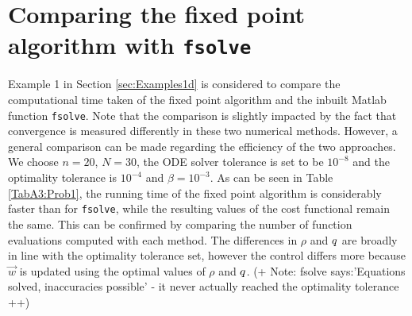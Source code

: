 \section{Comparing the fixed point algorithm with \texttt{fsolve}}
\label{app:fsolveComparison}

Example 1 in Section \ref{sec:Examples1d} is considered to compare the computational time taken of the fixed point algorithm and the inbuilt Matlab function \texttt{fsolve}. Note that the comparison is slightly impacted by the fact that convergence is measured differently in these two numerical methods. However, a general comparison can be made regarding the efficiency of the two approaches.
We choose $n=20$, $N=30$, the ODE solver tolerance is set to be $10^{-8}$ and the optimality tolerance is $10^{-4}$ and $\beta = 10^{-3}$. 
As can be seen in Table \ref{TabA3:Prob1}, the running time of the fixed point algorithm is considerably faster than for \texttt{fsolve}, while the resulting values of the cost functional remain the same. This can be confirmed by comparing the number of function evaluations computed with each method. The differences in $\rho$ and $q$ are broadly in line with the optimality tolerance set, however the control differs more because $\vec{w}$ is updated using the optimal values of $\rho$ and $q$. (+ Note: fsolve says:'Equations solved, inaccuracies possible' - it never actually reached the optimality tolerance ++)


